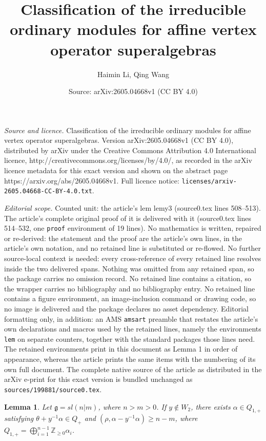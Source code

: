 \documentclass[10pt,a4paper]{amsart}
\title{Classification of the irreducible ordinary modules for affine vertex operator superalgebras}
\author{Haimin Li, Qing Wang}
\date{Source: arXiv:2605.04668v1 (CC BY 4.0)}
\newtheorem{lem}{Lemma}
\begin{document}
\maketitle

\noindent\emph{Source and licence.} Classification of the irreducible ordinary modules for affine vertex operator superalgebras. Version arXiv:2605.04668v1 (CC BY 4.0), distributed by arXiv under the Creative Commons Attribution 4.0 International licence, http://creativecommons.org/licenses/by/4.0/, as recorded in the arXiv licence metadata for this exact version and shown on the abstract page https://arxiv.org/abs/2605.04668v1. Full licence notice: \texttt{licenses/arxiv-2605.04668-CC-BY-4.0.txt}.\par\smallskip

\noindent\textit{Editorial scope.} Counted unit: the article's lem lemy3 (source0.tex lines 508--513). The article's complete original proof of it is delivered with it (source0.tex lines 514--532, one \texttt{proof} environment of 19 lines). No mathematics is written, repaired or re-derived: the statement and the proof are the article's own lines, in the article's own notation, and no retained line is substituted or re-flowed.  No further source-local context is needed: every cross-reference of every retained line resolves inside the two delivered spans.  Nothing was omitted from any retained span, so the package carries no omission record.  No retained line contains a citation, so the wrapper carries no bibliography and no bibliography entry.  No retained line contains a figure environment, an image-inclusion command or drawing code, so no image is delivered and the package declares no asset dependency.  Editorial formatting only, in addition: an AMS \texttt{amsart} preamble that restates the article's own declarations and macros used by the retained lines, namely the environments \texttt{lem} on separate counters, together with the standard packages those lines need.  The retained environments print in this document as Lemma 1 in order of appearance, whereas the article prints the same items with the numbering of its own full document.  The complete native source of the article as distributed in the arXiv e-print for this exact version is bundled unchanged as \texttt{sources/199881/source0.tex}.
\begin{lem}\label{lemy3}
Let $\mathfrak{g}=sl(n|m)$, where $n>m>0$.
If $y\notin W_2$,
there exists $\alpha\in Q_{1,+}$ satisfying $\theta+y^{-1}\alpha\in Q_+$ and $(\rho,\alpha-y^{-1}\alpha)\geq n-m$,
where $Q_{1,+}=\bigoplus_{i=1}^{n-1}\mathbb{Z}_{\geq0}\alpha_i$.
\end{lem}
\end{document}
